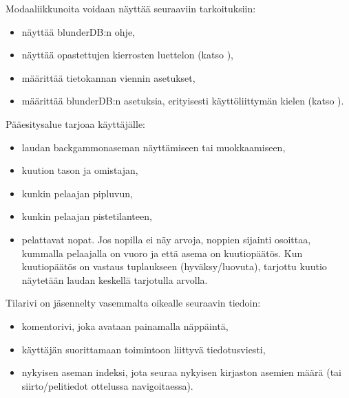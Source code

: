 \documentclass[letterpaper,10pt,finnish]{sphinxmanual}
\begin{document}
\sphinxAtStartPar
Modaali\sphinxhyphen{}ikkunoita voidaan näyttää seuraaviin tarkoituksiin:
\begin{itemize}
\item {} 
\sphinxAtStartPar
näyttää blunderDB:n ohje,

\item {} 
\sphinxAtStartPar
näyttää opastettujen kierrosten luettelon (katso {\hyperref[\detokenize{manuel:visites-guidees}]{}}),

\item {} 
\sphinxAtStartPar
määrittää tietokannan viennin asetukset,

\item {} 
\sphinxAtStartPar
määrittää blunderDB:n asetuksia, erityisesti käyttöliittymän kielen (katso {\hyperref[\detokenize{manuel:configuration}]{}}).

\end{itemize}

\sphinxAtStartPar
Pääesitysalue tarjoaa käyttäjälle:
\begin{itemize}
\item {} 
\sphinxAtStartPar
laudan backgammon\sphinxhyphen{}aseman näyttämiseen tai muokkaamiseen,

\item {} 
\sphinxAtStartPar
kuution tason ja omistajan,

\item {} 
\sphinxAtStartPar
kunkin pelaajan pip\sphinxhyphen{}luvun,

\item {} 
\sphinxAtStartPar
kunkin pelaajan pistetilanteen,

\item {} 
\sphinxAtStartPar
pelattavat nopat. Jos nopilla ei näy arvoja, noppien sijainti osoittaa, kummalla pelaajalla on vuoro ja että asema on kuutiopäätös. Kun kuutiopäätös on vastaus tuplaukseen (hyväksy/luovuta), tarjottu kuutio näytetään laudan keskellä tarjotulla arvolla.

\end{itemize}

\sphinxAtStartPar
Tilarivi on jäsennelty vasemmalta oikealle seuraavin tiedoin:
\begin{itemize}
\item {} 
\sphinxAtStartPar
komentorivi, joka avataan painamalla \sphinxhyphen{}näppäintä,

\item {} 
\sphinxAtStartPar
käyttäjän suorittamaan toimintoon liittyvä tiedotusviesti,

\item {} 
\sphinxAtStartPar
nykyisen aseman indeksi, jota seuraa nykyisen kirjaston asemien määrä (tai siirto\sphinxhyphen{}/pelitiedot ottelussa navigoitaessa).

\end{itemize}
\end{document}
